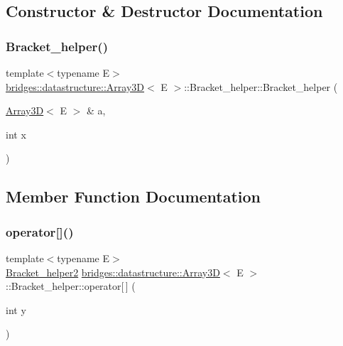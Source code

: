 \subsection{Constructor \& Destructor Documentation}
\mbox{\label{structbridges_1_1datastructure_1_1_array3_d_1_1_bracket__helper_a02888ffe46f3f1bfc8dda232bd2a3634}} 
\subsubsection{\texorpdfstring{Bracket\_helper()}{Bracket\_helper()}}
{\footnotesize\ttfamily template$<$typename E$>$ \\
\mbox{\hyperlink{classbridges_1_1datastructure_1_1_array3_d}{bridges\+::datastructure\+::\+Array3D}}$<$ E $>$\+::Bracket\+\_\+helper\+::\+Bracket\+\_\+helper (\begin{DoxyParamCaption}\item[{\mbox{\hyperlink{classbridges_1_1datastructure_1_1_array3_d}{Array3D}}$<$ E $>$ \&}]{a,  }\item[{int}]{x }\end{DoxyParamCaption})\hspace{0.3cm}{\ttfamily [inline]}}



\subsection{Member Function Documentation}
\mbox{\label{structbridges_1_1datastructure_1_1_array3_d_1_1_bracket__helper_ac5abb4226f77526ae2b77d96fd98f9fa}} 
\subsubsection{\texorpdfstring{operator[]()}{operator[]()}}
{\footnotesize\ttfamily template$<$typename E$>$ \\
\mbox{\hyperlink{structbridges_1_1datastructure_1_1_array3_d_1_1_bracket__helper2}{Bracket\+\_\+helper2}} \mbox{\hyperlink{classbridges_1_1datastructure_1_1_array3_d}{bridges\+::datastructure\+::\+Array3D}}$<$ E $>$\+::Bracket\+\_\+helper\+::operator\mbox{[}$\,$\mbox{]} (\begin{DoxyParamCaption}\item[{int}]{y }\end{DoxyParamCaption})\hspace{0.3cm}{\ttfamily [inline]}}



